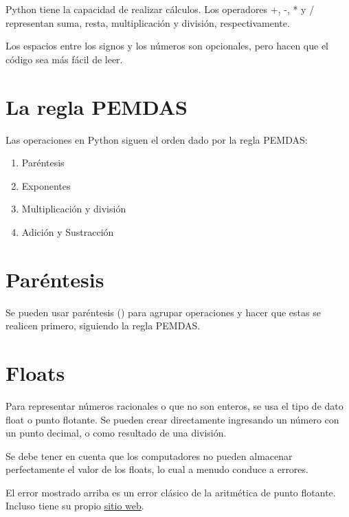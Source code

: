 \documentclass{report}
\begin{document}
Python tiene la capacidad de realizar cálculos. Los operadores +, -, * y / representan suma, resta, multiplicación y división, respectivamente.


Los espacios entre los signos y los números son opcionales, pero hacen que el código sea más fácil de leer.

\section{La regla PEMDAS}

Las operaciones en Python siguen el orden dado por la regla PEMDAS:

\begin{enumerate}
  \item Paréntesis
  \item Exponentes
  \item Multiplicación y división
  \item Adición y Sustracción
\end{enumerate}


\section{Paréntesis}

Se pueden usar paréntesis () para agrupar operaciones y hacer que estas se realicen primero, siguiendo la regla PEMDAS.


\section{Floats}
    
Para representar números racionales o que no son enteros, se usa el tipo de dato float o punto flotante. Se pueden crear directamente ingresando un número con un punto decimal, o como resultado de una división.


Se debe tener en cuenta que los computadores no pueden almacenar perfectamente el valor de los floats, lo cual a menudo conduce a errores.


El error mostrado arriba es un error clásico de la aritmética de punto flotante. Incluso tiene su propio \href{https://0.30000000000000004.com}{\underline{sitio web}}.
\end{document}
